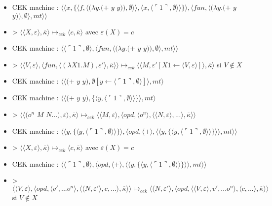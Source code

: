 \documentclass[10pt,a4paper]{article}
\begin{document}
\begin{itemize}
					\item[] CEK machine : $\langle\langle x,\{\langle f,\langle(\lambda y.(+$ $y$ $y)),\emptyset\rangle\rangle,\langle x,\langle\ulcorner 1\urcorner,\emptyset\rangle\rangle\}\rangle,\langle fun,\langle(\lambda y.(+$ $y$ $y)),\emptyset\rangle,mt\rangle\rangle$	
					\item[] > $\langle\langle X,\varepsilon\rangle,\overline{\kappa}\rangle \longmapsto_{cek} \langle c,\overline{\kappa}\rangle$ avec $\varepsilon(X) = c$
					\item[] CEK machine : $\langle \langle\ulcorner 1\urcorner,\emptyset\rangle,\langle fun,\langle(\lambda y.(+$ $y$ $y)),\emptyset\rangle,mt\rangle\rangle$	
					\item[] > $\langle\langle V,\varepsilon\rangle,\langle fun,\langle (\lambda X1.M),\varepsilon'\rangle,\overline{\kappa} \rangle \rangle \longmapsto_{cek} \langle \langle M,\varepsilon'[X1 \leftarrow \langle V,\varepsilon\rangle]\rangle,\overline{\kappa}\rangle$ si $V \notin X$
					\item[] CEK machine : $\langle\langle(+$ $y$ $y),\emptyset[y \leftarrow\langle\ulcorner 1\urcorner,\emptyset\rangle]\rangle ,mt\rangle$
					\item[] CEK machine : $\langle\langle(+$ $y$ $y),\{\langle y,\langle\ulcorner 1\urcorner,\emptyset\rangle\rangle\}\rangle ,mt\rangle$
					\item[] > $\langle\langle(o^{n}$ $M$ $N...),\varepsilon\rangle,\overline{\kappa}\rangle \longmapsto_{cek} \langle \langle M,\varepsilon\rangle,\langle opd,\langle o^{n}\rangle,\langle \langle N,\varepsilon\rangle,...\rangle,\overline{\kappa}\rangle\rangle$
					\item[] CEK machine : $\langle\langle y,\{\langle y,\langle\ulcorner 1\urcorner,\emptyset\rangle\rangle\}\rangle ,\langle opd,\langle+\rangle,\langle\langle y,\{\langle y,\langle\ulcorner 1\urcorner,\emptyset\rangle\rangle\}\rangle\rangle,mt\rangle\rangle$
					\item[] > $\langle\langle X,\varepsilon\rangle,\overline{\kappa}\rangle \longmapsto_{cek} \langle c,\overline{\kappa}\rangle$ avec $\varepsilon(X) = c$
					\item[] CEK machine : $\langle\langle\ulcorner 1\urcorner,\emptyset\rangle,\langle opd,\langle+\rangle,\langle\langle y,\{\langle y,\langle\ulcorner 1\urcorner,\emptyset\rangle\rangle\}\rangle\rangle,mt\rangle\rangle$
					\item[] > $\langle \langle V,\varepsilon\rangle,\langle opd,\langle v',...o^{n}\rangle,\langle  \langle N,\varepsilon'\rangle,c,...\rangle,\overline{\kappa}\rangle\rangle \longmapsto_{cek} \langle \langle N,\varepsilon'\rangle,\langle opd,\langle  \langle V,\varepsilon\rangle,v',...o^{n}\rangle,\langle c,...\rangle,\overline{\kappa}\rangle\rangle$ si $V \notin X$

\end{itemize}
\end{document}
